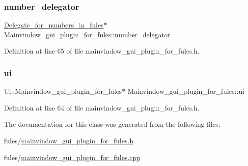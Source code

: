 \subsubsection{\texorpdfstring{number\+\_\+delegator}{number\_delegator}}
{\footnotesize\ttfamily \hyperlink{classDelegate__for__numbers__in__fules}{Delegate\+\_\+for\+\_\+numbers\+\_\+in\+\_\+fules}$\ast$ Mainvindow\+\_\+gui\+\_\+plugin\+\_\+for\+\_\+fules\+::number\+\_\+delegator\hspace{0.3cm}{\ttfamily [private]}}



Definition at line 65 of file mainvindow\+\_\+gui\+\_\+plugin\+\_\+for\+\_\+fules.\+h.

\mbox{\label{classMainvindow__gui__plugin__for__fules_acdd8ed5ce96f1565bc722f1965faca67}} 
\subsubsection{\texorpdfstring{ui}{ui}}
{\footnotesize\ttfamily Ui\+::\+Mainvindow\+\_\+gui\+\_\+plugin\+\_\+for\+\_\+fules$\ast$ Mainvindow\+\_\+gui\+\_\+plugin\+\_\+for\+\_\+fules\+::ui\hspace{0.3cm}{\ttfamily [private]}}



Definition at line 64 of file mainvindow\+\_\+gui\+\_\+plugin\+\_\+for\+\_\+fules.\+h.



The documentation for this class was generated from the following files\+:\begin{DoxyCompactItemize}
\item 
fules/\hyperlink{mainvindow__gui__plugin__for__fules_8h}{mainvindow\+\_\+gui\+\_\+plugin\+\_\+for\+\_\+fules.\+h}\item 
fules/\hyperlink{mainvindow__gui__plugin__for__fules_8cpp}{mainvindow\+\_\+gui\+\_\+plugin\+\_\+for\+\_\+fules.\+cpp}\end{DoxyCompactItemize}
